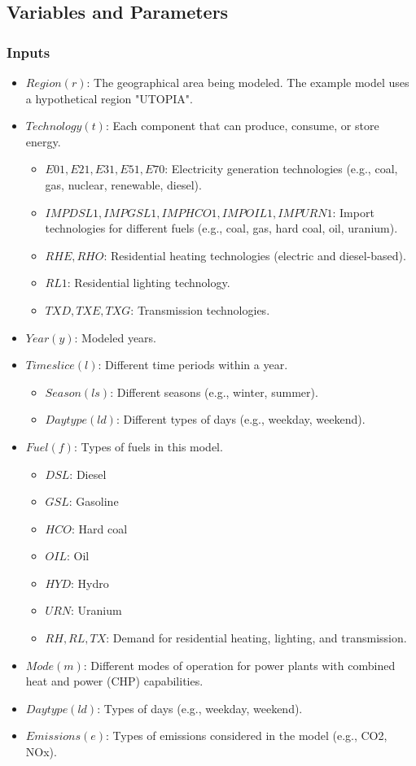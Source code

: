 \documentclass[11pt]{article}
\begin{document}
\subsection{Variables and Parameters}
\subsubsection{Inputs}
\begin{itemize}
    \item $Region(r)$: The geographical area being modeled. The example model uses a hypothetical region "UTOPIA".
    \item $Technology(t)$: Each component that can produce, consume, or store energy.
    \begin{itemize}
        \item $E01, E21, E31, E51, E70$: Electricity generation technologies (e.g., coal, gas, nuclear, renewable, diesel).
        \item $IMPDSL1, IMPGSL1, IMPHCO1, IMPOIL1, IMPURN1$: Import technologies for different fuels (e.g., coal, gas, hard coal, oil, uranium).
        \item $RHE, RHO$: Residential heating technologies (electric and diesel-based).
        \item $RL1$: Residential lighting technology.
        \item $TXD, TXE, TXG$: Transmission technologies.
    \end{itemize}
    \item $Year(y)$: Modeled years.
    \item $Timeslice(l)$: Different time periods within a year.
    \begin{itemize}
        \item $Season(ls)$: Different seasons (e.g., winter, summer).
        \item $Daytype(ld)$: Different types of days (e.g., weekday, weekend).
    \end{itemize}
    \item $Fuel(f)$: Types of fuels in this model.
    \begin{itemize}
        \item $DSL$: Diesel
        \item $GSL$: Gasoline
        \item $HCO$: Hard coal
        \item $OIL$: Oil
        \item $HYD$: Hydro
        \item $URN$: Uranium
        \item $RH, RL, TX$: Demand for residential heating, lighting, and transmission.
    \end{itemize}
    \item $Mode(m)$: Different modes of operation for power plants with combined heat and power (CHP) capabilities.
    \item $Daytype(ld)$: Types of days (e.g., weekday, weekend).
    \item $Emissions(e)$: Types of emissions considered in the model (e.g., CO2, NOx).
\end{itemize}
\end{document}
